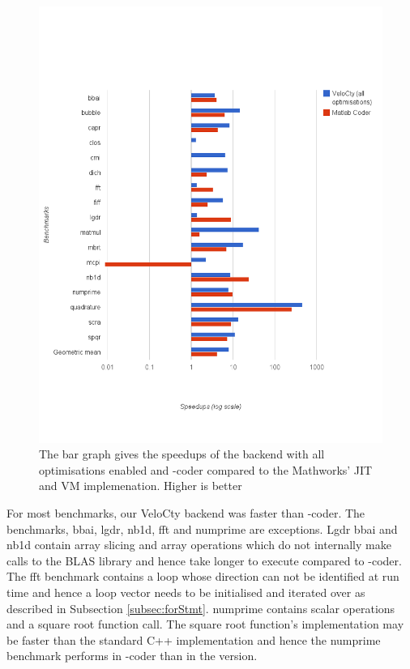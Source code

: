 \begin{figure}[htbp]
\centering
\includegraphics[scale=0.5]{Figures/results_cwochecks.png}
\caption[Experiment results for the baseline \velocty backend for \matlab benchmarks]{The bar graph gives the speedups of the \velocty backend with all optimisations enabled and \matlab-coder compared to the Mathworks' JIT and VM implemenation. Higher is better }
\label{fig:results_cwochecks}
\end{figure}

For most benchmarks, our VeloCty backend was faster than \matlab-coder. The benchmarks, \textsf{bbai}, \textsf{lgdr}, \textsf{nb1d}, \textsf{fft} and \textsf{numprime} are exceptions. \textsf{Lgdr} \textsf{bbai} and \textsf{nb1d} contain array slicing and array operations which do not internally make calls to the BLAS library and hence take longer to execute compared to \matlab-coder. The \textsf{fft} benchmark contains a loop whose direction can not be identified at run time and hence a loop vector needs to be initialised and iterated over as described in Subsection \ref{subsec:forStmt}. \textsf{numprime} contains scalar operations and a square root function call. The square root function's \matlab implementation may be faster than the standard C++ implementation and hence the \textsf{numprime} benchmark performs in \matlab-coder than in the \velocty version. 

